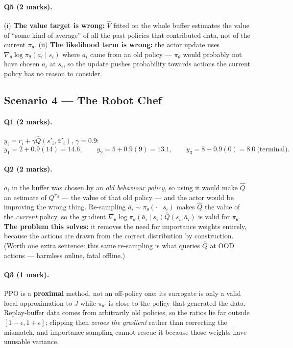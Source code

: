\documentclass[11pt,a4paper]{article}
\begin{document}
\paragraph{Q5 (2 marks).} (i) \textbf{The value target is wrong:} $\hat V$
fitted on the whole buffer estimates the value of ``some kind of average'' of
all the past policies that contributed data, not of the current $\pi_\theta$.
(ii) \textbf{The likelihood term is wrong:} the actor update uses
$\nabla_\theta\log\pi_\theta(a_i\mid s_i)$ where $a_i$ came from an old
policy --- $\pi_\theta$ would probably not have chosen $a_i$ at $s_i$, so the
update pushes probability towards actions the current policy has no reason to
consider.

\subsection{Scenario 4 --- The Robot Chef}

\paragraph{Q1 (2 marks).} $y_i=r_i+\gamma\hat Q(s'_i,\bar a'_i)$, $\gamma=0.9$:
\[
y_1=2+0.9(14)=\mathbf{14.6},\qquad
y_2=5+0.9(9)=\mathbf{13.1},\qquad
y_3=8+0.9(0)=\mathbf{8.0}\ \text{(terminal)} .
\]

\paragraph{Q2 (2 marks).} $a_i$ in the buffer was chosen by an \emph{old
behaviour policy}, so using it would make $\hat Q$ an estimate of
$Q^{\pi_\beta}$ --- the value of that old policy --- and the actor would be
improving the wrong thing. Re-sampling $\bar a_i\sim\pi_\theta(\cdot\mid s_i)$
makes $\hat Q$ the value of the \emph{current} policy, so the gradient
$\nabla_\theta\log\pi_\theta(\bar a_i\mid s_i)\hat Q(s_i,\bar a_i)$ is valid
for $\pi_\theta$. \textbf{The problem this solves:} it removes the need for
importance weights entirely, because the actions are drawn from the correct
distribution by construction. (Worth one extra sentence: this same
re-sampling is what queries $\hat Q$ at OOD actions --- harmless online,
fatal offline.)

\paragraph{Q3 (1 mark).} PPO is a \textbf{proximal} method, not an off-policy
one: its surrogate is only a valid local approximation to $J$ while
$\pi_{\theta'}$ is close to the policy that generated the data. Replay-buffer
data comes from arbitrarily old policies, so the ratios lie far outside
$[1-\epsilon,1+\epsilon]$; clipping then \emph{zeroes the gradient} rather
than correcting the mismatch, and importance sampling cannot rescue it because
those weights have unusable variance.
\end{document}
